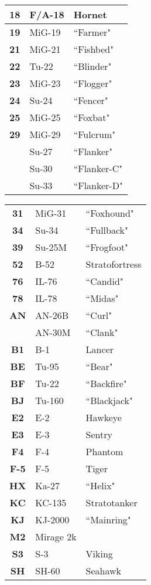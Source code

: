 \documentclass[fontInter, widesubsec]{TechCheck}
\begin{document}
\begin{multicols*}{2}
\begin{center}
\begin{tabular}{c | p{1.5cm}  p{2.5cm}}
				\textbf{18} & F/A-18 & Hornet \\
				\midrule
				\textbf{19} & MiG-19 & ``Farmer" \\
				\textbf{21} & MiG-21 & ``Fishbed" \\
				\textbf{22} & Tu-22 & ``Blinder" \\
				\textbf{23} & MiG-23 & ``Flogger" \\
				\textbf{24} & Su-24 & ``Fencer" \\
				\textbf{25} & MiG-25 & ``Foxbat" \\
				\midrule
				\textbf{29} & MiG-29 & ``Fulcrum" \\
				& Su-27 & ``Flanker" \\
				& Su-30 & ``Flanker-C" \\
				& Su-33 & ``Flanker-D" \\
				\midrule
			\end{tabular}
		\end{center}
		\columnbreak

		\begin{center}
			\begin{tabular}{c | p{1.5cm}  p{2.5cm}}
				\midrule
				\textbf{31} & MiG-31 & ``Foxhound" \\
				\textbf{34} & Su-34 & ``Fullback" \\
				\textbf{39} & Su-25M & ``Frogfoot" \\
				\midrule
				\textbf{52} & B-52 & Stratofortress \\
				\midrule
				\textbf{76} & IL-76 & ``Candid" \\
				\textbf{78} & IL-78 & ``Midas" \\
				\textbf{AN} & AN-26B & ``Curl" \\
				& AN-30M & ``Clank" \\
				\midrule
				\textbf{B1} & B-1 & Lancer \\
				\midrule
				\textbf{BE} & Tu-95 & ``Bear" \\
				\textbf{BF} & Tu-22 & ``Backfire" \\
				\textbf{BJ} & Tu-160 & ``Blackjack" \\
				\midrule
				\textbf{E2} & E-2 & Hawkeye \\
				\textbf{E3} & E-3 & Sentry \\
				\midrule
				\textbf{F4} & F-4 & Phantom \\
				\textbf{F-5} & F-5 & Tiger \\
				\midrule
				\textbf{HX} & Ka-27 & ``Helix" \\
				\midrule
				\textbf{KC} & KC-135 & Stratotanker \\
				\midrule
				\textbf{KJ} & KJ-2000 & ``Mainring" \\
				\textbf{M2} & Mirage 2k & \\
				\midrule
				\textbf{S3} & S-3 & Viking\\
				\textbf{SH} & SH-60 & Seahawk \\
				\bottomrule
			\end{tabular}
		\end{center}
	\end{multicols*}
\end{document}
